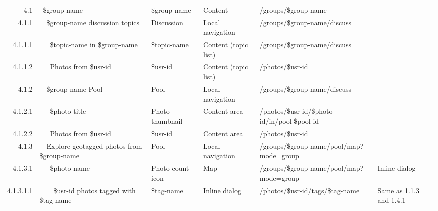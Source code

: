 \documentclass[12pt,a4paper]{article}
\begin{document}
\begin{landscape}
\begin{table}[h!b!p!]
\begin{center}
\begin{tiny}
\begin{tabular}{r|l|l|l|l|p{3cm}}
              4.1 &
              ~\$group-name &
              \$group-name &
              Content &
              /groups/\$group-name &
              \\

                4.1.1 &
                ~~\$group-name discussion topics &
                Discussion &
                Local navigation &
                /groups/\$group-name/discuss &
                \\

                  4.1.1.1 &
                  ~~~\$topic-name in \$group-name &
                  \$topic-name &
                  Content (topic list) &
                  /groups/\$group-name/discuss &
                  \\

                  4.1.1.2 &
                  ~~~Photos from \$usr-id &
                  \$usr-id &
                  Content (topic list) &
                  /photos/\$usr-id &
                  \\

                4.1.2 &
                ~~\$group-name Pool &
                Pool &
                Local navigation &
                /groups/\$group-name/discuss &
                \\

                  4.1.2.1 &
                  ~~~\$photo-title &
                  Photo thumbnail &
                  Content area &
                  /photos/\$usr-id/\$photo-id/in/pool-\$pool-id &
                  \\

                  4.1.2.2 &
                  ~~~Photos from \$usr-id &
                  \$usr-id &
                  Content area &
                  /photos/\$usr-id &
                  \\

                4.1.3 &
                ~~Explore geotagged photos from \$group-name  &
                Pool &
                Local navigation &
                /groups/\$group-name/pool/map?mode=group &
                \\

                  4.1.3.1 &
                  ~~~\$photo-name &
                  Photo count icon &
                  Map &
                  /groups/\$group-name/pool/map?mode=group &
                  Inline dialog\\

                    4.1.3.1.1 &
                    ~~~~\$usr-id photos tagged with \$tag-name &
                    \$tag-name &
                    Inline dialog &
                    /photos/\$usr-id/tags/\$tag-name &
                    Same as 1.1.3 and 1.4.1\\


\end{tabular}
\end{tiny}
\end{center}
\end{table}
\end{landscape}
\end{document}
